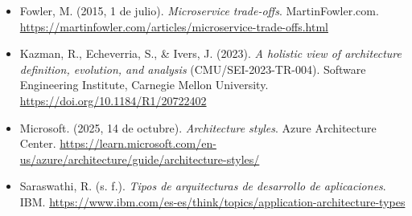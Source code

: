 \documentclass[12pt]{article}
\begin{document}
	\begin{itemize}[
		leftmargin=1.27cm,
		label={},
		itemindent=-1.27cm,
		itemsep=6pt
		]
		
		https://docs.docker.com/
		
		https://www.databricks.com/es/blog/what-is-orchestration
		https://www.advsyscon.com/blog/service-orchestration-what-is/
		https://kubernetes.io/es/
		https://cloud.google.com/learn/what-is-kubernetes?hl=es
		https://www.ibm.com/mx-es/think/topics/kubernetes
		https://aws.amazon.com/es/microservices/
		https://cloud.google.com/learn/what-is-microservices-architecture?hl=es-419
		https://www.ibm.com/mx-es/think/topics/microservices
		https://oauth.net/2/
		https://auth0.com/es/intro-to-iam/what-is-oauth-2
		https://medium.com/@csw11235/understanding-the-12-factor-app-methodology-why-we-build-cloud-applications-the-way-we-do-7aed4a98fbd8
		https://medium.com/cloud-native-daily/what-are-12-factor-principles-of-cloud-native-microservices-eb25e95e5906
		
		
		\item Fowler, M. (2015, 1 de julio).
		\textit{Microservice trade-offs}.
		MartinFowler.com.
		\url{https://martinfowler.com/articles/microservice-trade-offs.html}
		
		\item Kazman, R., Echeverria, S., \& Ivers, J. (2023).
		\textit{A holistic view of architecture definition, evolution,
			and analysis} (CMU/SEI-2023-TR-004).
		Software Engineering Institute, Carnegie Mellon University.
		\url{https://doi.org/10.1184/R1/20722402}
		
		\item Microsoft. (2025, 14 de octubre).
		\textit{Architecture styles}.
		Azure Architecture Center.
		\url{https://learn.microsoft.com/en-us/azure/architecture/guide/architecture-styles/}
		
		\item Saraswathi, R. (s. f.).
		\textit{Tipos de arquitecturas de desarrollo de aplicaciones}.
		IBM.
		\url{https://www.ibm.com/es-es/think/topics/application-architecture-types}
	\end{itemize}
	
\end{document}

